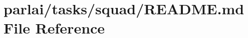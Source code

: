 \hypertarget{parlai_2tasks_2squad_2README_8md}{}\section{parlai/tasks/squad/\+R\+E\+A\+D\+ME.md File Reference}
\label{parlai_2tasks_2squad_2README_8md}

